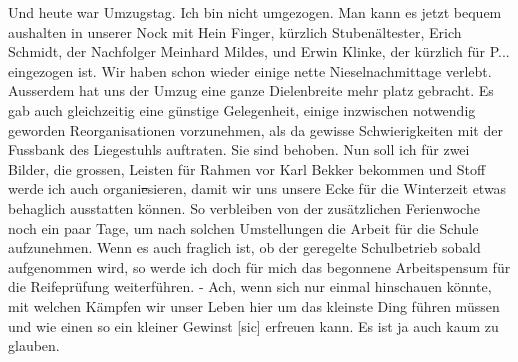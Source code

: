 \def\day{7. September 1943}
\mktitle

Und heute war Umzugstag.
Ich bin nicht umgezogen.
Man kann es jetzt bequem aushalten in unserer Nock mit Hein Finger, k\"{u}rzlich Stuben\"{a}ltester, Erich Schmidt, der Nachfolger Meinhard Mildes, und Erwin Klinke, der k\"{u}rzlich f\"{u}r P... eingezogen ist.
Wir haben schon wieder einige nette Nieselnachmittage verlebt.
Ausserdem hat uns der Umzug eine ganze Dielenbreite mehr platz gebracht.
Es gab auch gleichzeitig eine g\"{u}nstige Gelegenheit, einige inzwischen notwendig geworden Reorganisationen vorzunehmen, als da gewisse Schwierigkeiten mit der Fussbank des Liegestuhls auftraten.
Sie sind behoben.
Nun soll ich f\"{u}r zwei Bilder, die grossen, Leisten f\"{u}r Rahmen vor Karl Bekker bekommen und Stoff werde ich auch organi\st{e}sieren, damit wir uns unsere Ecke f\"{u}r die Winterzeit etwas behaglich ausstatten k\"{o}nnen.
So verbleiben von der zus\"{a}tzlichen Ferienwoche noch ein paar Tage, um nach solchen Umstellungen die Arbeit f\"{u}r die Schule aufzunehmen.
Wenn es auch fraglich ist, ob der geregelte Schulbetrieb sobald aufgenommen wird, so werde ich doch f\"{u}r mich das begonnene Arbeitspensum f\"{u}r die Reifepr\"{u}fung weiterf\"{u}hren.
- Ach, wenn sich nur einmal hinschauen k\"{o}nnte, mit welchen K\"{a}mpfen wir unser Leben hier um das kleinste Ding f\"{u}hren m\"{u}ssen und wie einen so ein kleiner Gewinst{\color{red} [sic] } erfreuen kann. Es ist ja auch kaum zu glauben.

\clearpage
